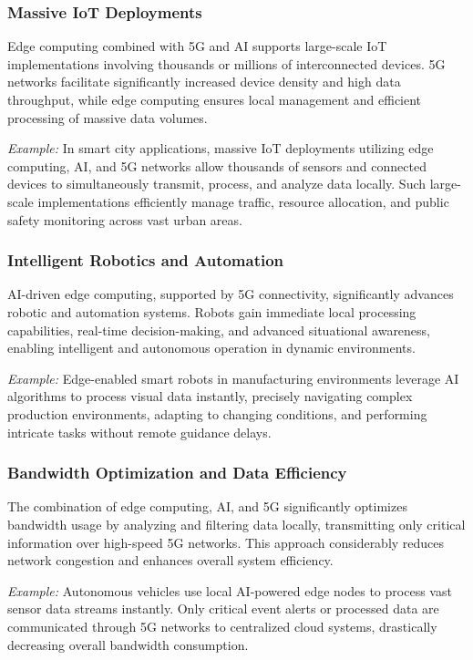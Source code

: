 \documentclass[runningheads]{llncs}
\begin{document}
\subsubsection{Massive IoT Deployments}
Edge computing combined with 5G and AI supports large-scale IoT implementations involving thousands or millions of interconnected devices. 5G networks facilitate significantly increased device density and high data throughput, while edge computing ensures local management and efficient processing of massive data volumes.

\textit{Example:} In smart city applications, massive IoT deployments utilizing edge computing, AI, and 5G networks allow thousands of sensors and connected devices to simultaneously transmit, process, and analyze data locally. Such large-scale implementations efficiently manage traffic, resource allocation, and public safety monitoring across vast urban areas.

\subsubsection{Intelligent Robotics and Automation}
AI-driven edge computing, supported by 5G connectivity, significantly advances robotic and automation systems. Robots gain immediate local processing capabilities, real-time decision-making, and advanced situational awareness, enabling intelligent and autonomous operation in dynamic environments.

\textit{Example:} Edge-enabled smart robots in manufacturing environments leverage AI algorithms to process visual data instantly, precisely navigating complex production environments, adapting to changing conditions, and performing intricate tasks without remote guidance delays.

\subsubsection{Bandwidth Optimization and Data Efficiency}
The combination of edge computing, AI, and 5G significantly optimizes bandwidth usage by analyzing and filtering data locally, transmitting only critical information over high-speed 5G networks. This approach considerably reduces network congestion and enhances overall system efficiency.

\textit{Example:} Autonomous vehicles use local AI-powered edge nodes to process vast sensor data streams instantly. Only critical event alerts or processed data are communicated through 5G networks to centralized cloud systems, drastically decreasing overall bandwidth consumption.
\end{document}
